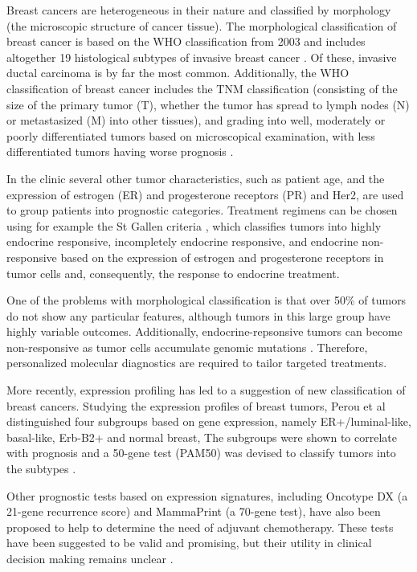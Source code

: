 Breast cancers are heterogeneous in their nature and classified by morphology
(the microscopic structure of cancer tissue).
The morphological classification of breast cancer is based on the WHO
classification from 2003 and includes altogether 19 histological subtypes of
invasive breast cancer \citep{Tavassoli2003,Weigelt2009}. Of these, invasive
ductal carcinoma is by far the most common. Additionally, the WHO
classification of breast cancer includes the TNM classification (consisting of
the size of the primary tumor (T), whether the tumor has spread to
lymph nodes (N) or metastasized (M) into other tissues), and grading
into well, moderately or poorly differentiated tumors based on
microscopical examination,
with less differentiated tumors having worse prognosis \citep{Tavassoli2003}.

In the clinic several other tumor characteristics, such as patient age, and the
expression of estrogen (ER) and progesterone receptors (PR) and Her2, are used
to group patients into prognostic categories. Treatment regimens can be chosen
using for example the St Gallen criteria \citep{Goldhirsch2007}, which
classifies tumors into highly endocrine responsive, incompletely endocrine
responsive, and endocrine non-responsive based on the expression of estrogen
and progesterone receptors in tumor cells and, consequently, the response
to endocrine treatment.

One of the problems with morphological classification is that over 50\% of
tumors do not show any particular features, although tumors in this large
group have highly variable outcomes. Additionally, endocrine-repsonsive tumors
can become non-responsive as tumor cells accumulate genomic mutations \citep{Oesterreich2013}.
Therefore, personalized molecular diagnostics are required to tailor targeted treatments.

More recently, expression profiling has led to a suggestion of new
classification of breast cancers. Studying the expression profiles of breast
tumors, Perou et al \citep{Perou2000} distinguished four subgroups based on
gene expression, namely ER+/luminal-like, basal-like, Erb-B2+ and normal
breast, The subgroups were shown to correlate with prognosis and a 50-gene
test (PAM50) was devised to classify tumors into the subtypes
\citep{Parker2009}.

Other prognostic tests based on expression signatures, including Oncotype DX
(a 21-gene recurrence score) and MammaPrint (a 70-gene test), have also been
proposed to help to determine the need of adjuvant chemotherapy. These tests
have been suggested to be valid and promising, but their utility in clinical
decision making remains unclear \citep{Azim2013}.




